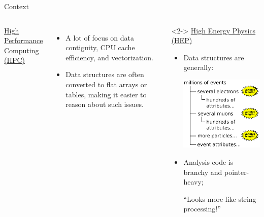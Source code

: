 \documentclass[aspectratio=169]{beamer}
\begin{document}
\begin{frame}{Context}
\vspace{0.35 cm}
\begin{columns}[t]
\underline{High Performance Computing (HPC)}

\vspace{0.15 cm}
\begin{itemize}
\item A lot of focus on data contiguity, CPU cache efficiency, and vectorization.
\item Data structures are often converted to flat arrays or tables, making it easier to reason about such issues.
\end{itemize}

\begin{uncoverenv}<2->
\underline{High Energy Physics (HEP)}

\vspace{0.15 cm}
\begin{itemize}
\item Data structures are generally:

\begin{center}
\includegraphics[width=0.7\linewidth]{event-structure.pdf}
\end{center}

\item Analysis code is branchy and pointer-heavy;

``Looks more like string processing!''
\end{itemize}
\end{uncoverenv}
\end{columns}
\end{frame}
\end{document}
